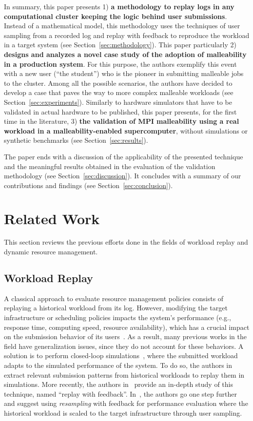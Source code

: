 \documentclass[a4paper,fleqn]{cas-dc}
\begin{document}
In summary, this paper presents 
1) \textbf{a methodology to replay logs in any computational cluster keeping the logic behind user submissions}. 
Instead of a mathematical model, this methodology uses the techniques of user sampling from a recorded log and replay with feedback to reproduce the workload in a target system (see Section~\ref{sec:methodology}).
This paper particularly 
2) \textbf{designs and analyzes a novel case study of the adoption of malleability in a production system}. For this purpose, the authors exemplify this event with a new user (``the student'') who is the pioneer in submitting malleable jobs to the cluster. Among all the possible scenarios, the authors have decided to develop a case that paves the way to more complex malleable workloads (see Section~\ref{sec:experiments}).
Similarly to hardware simulators that have to be validated in actual hardware to be published, this paper presents, for the first time in the literature, 
3) \textbf{the validation of MPI malleability using a real workload in a malleability-enabled supercomputer}, without simulations or synthetic benchmarks (see Section~\ref{sec:results}). 

The paper ends with a discussion of the applicability of the presented technique and the meaningful results obtained in the evaluation of the validation methodology (see Section~\ref{sec:discussion}). It concludes with a summary of our contributions and findings (see Section~\ref{sec:conclusion}).

\section{Related Work}\label{sec:related}
This section reviews the previous efforts done in the fields of workload replay and dynamic resource management.

\subsection{Workload Replay}
A classical approach to evaluate resource management policies consists of replaying a historical workload from its log.
However, modifying the target infrastructure or scheduling policies impacts the system's performance (e.g., response time, computing speed, resource availability),
which has a crucial impact on the submission behavior of its users~\cite{zakay_preserving_2014, schlagkamp_influence_2017}.
As a result, many previous works in the field have generalization issues, since they do not account for these behaviors.
A solution is to perform closed-loop simulations~\cite{schroeder_open_2006},
where the submitted workload adapts to the simulated performance of the system.
To do so, the authors in~\cite{zakay_identifying_2013} extract relevant submission patterns from historical workloads to replay them in simulations.
More recently, the authors in~\cite{madon_replay_2024} provide an in-depth study of this technique, named ``replay with feedback''.
In~\cite{feitelson_resampling_2021}, the authors go one step further and suggest using \emph{resampling} with feedback for performance evaluation where the historical workload is scaled to the target infrastructure through user sampling.
\end{document}
